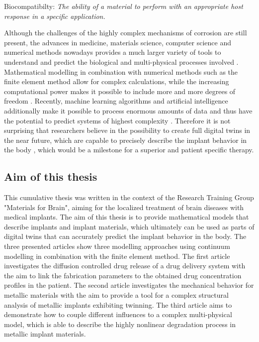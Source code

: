 \begin{center}
  \begin{minipage}{0.9\textwidth}
  Biocompatibilty: 
  \textit{
    The ability of a material to perform with an appropriate host response in a specific application.\\
  }
\end{minipage}
\end{center}
Although the challenges of the highly complex mechanisms of corrosion are still present, the advances in medicine, materials science, computer science and numerical methods nowadays provides a much larger variety of tools to understand and predict the biological and multi-physical processes involved \supercite{wang_biodegradable_2020,prakasam_biodegradable_2017}. Mathematical modelling in combination with numerical methods such as the finite element method allow for complex calculations, while the increasing computational power makes it possible to include more and more degrees of freedom \supercite{menicucci_toothimplant_2002,kladovasilakis_finite_2020,alemayehu_three-dimensional_2021,salaha_biomechanical_2023}. Recently, machine learning algorithms and artificial intelligence additionally make it possible to process enormous amounts of data and thus have the potential to predict systems of highest complexity \supercite{revilla-leon_artificial_2023,suwardi_machine_2022}. Therefore it is not surprising that researchers believe in the possibility to create full digital twins in the near future, which are capable to precisely describe the implant behavior in the body \supercite{cellina_digital_2023,pankaj_patientspecific_2013,erol_digital_2020}, which would be a milestone for a superior and patient specific therapy.  

\subsection{Aim of this thesis}
This cumulative thesis was written in the context of the Research Training Group "Materials for Brain", aiming for the localized treatment of brain diseases with medical implants. The aim of this thesis is to provide mathematical models that describe implants and implant materials, which ultimately can be used as parts of digital twins that can accurately predict the implant behavior in the body. The three presented articles show three modelling approaches using continuum modelling in combination with the finite element method. The first article investigates the diffusion controlled drug release of a drug delivery system with the aim to link the fabrication parameters to the obtained drug concentration profiles in the patient. The second article investigates the mechanical behavior for metallic materials with the aim to provide a tool for a complex structural analysis of metallic implants exhibiting twinning. The third article aims to demonstrate how to couple different influences to a complex multi-physical model, which is able to describe the highly nonlinear degradation process in metallic implant materials. 
